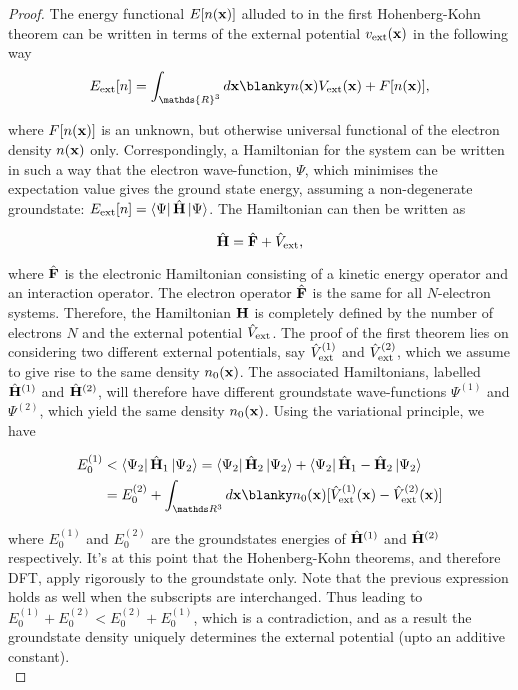 \documentclass{homework}
\begin{document}
\begin{proof}
The energy functional $E[n({\bf x})]$ alluded to in the first Hohenberg-Kohn theorem can be written in terms of the external potential $v_{\textnormal{ext}}({\bf x})$ in the following way 
\begin{equation}
    E_{\textnormal{ext}}[n] = \int_{\mathds{R}^3} d{\bf x}  \blanky n({\bf x}) V_{\textnormal{ext}}({\bf x}) + F[n({\bf x})],
\end{equation}

where $F[n({\bf x})]$ is an unknown, but otherwise universal functional of the electron density $n({\bf x})$ only. Correspondingly, a Hamiltonian for the system can be written in such a way that the electron wave-function, $\Psi$, which minimises the expectation value gives the ground state energy, assuming a non-degenerate groundstate: $E_{\textnormal{ext}}[n] = \bra{\Psi}\hat{\bf H}\ket{\Psi}$. 
The Hamiltonian can then be written as 

$$
\hat{\bf H} = \hat{\bf F} + \hat{V}_{\textnormal{ext}},
$$

where $\hat{\bf F}$ is the electronic Hamiltonian consisting of a kinetic energy operator and an interaction operator. The electron operator $\hat{\bf F}$ is the same for all $N$-electron systems. Therefore, the Hamiltonian ${\bf H}$ is completely defined by the number of electrons $N$ and the external potential $\hat{V}_{\textnormal{ext}}$. The proof of the first theorem lies on considering two different external potentials, say $\hat{V}^{(1)}_{\textnormal{ext}}$ and $\hat{V}^{(2)}_{\textnormal{ext}}$, which we assume to give rise to the same density $n_{0}({\bf x})$. The associated Hamiltonians, labelled $\hat{\bf H}^{(1)}$ and $\hat{\bf H}^{(2)}$, will therefore have different groundstate wave-functions ${\Psi}^{(1)}$ and ${\Psi}^{(2)}$, which yield the same density $n_{0}({\bf x})$. Using the variational principle, we have 

\begin{align}
    E_{0}^{(1)} &< \bra{\Psi_2} \hat{\bf H}_1 \ket{\Psi_2} = \bra{\Psi_2} \hat{\bf H}_2 \ket{\Psi_2} + \bra{\Psi_2} \hat{\bf H}_1-\hat{\bf H}_2 \ket{\Psi_2} \\
    &=  E_{0}^{(2)} + \int_{\R^3} d{\bf x} \blanky n_{0}({\bf x}) [\hat{V}^{(1)}_{\textnormal{ext}}({\bf x})-\hat{V}^{(2)}_{\textnormal{ext}}({\bf x})]
\end{align}

where $E_{0}^{(1)}$ and $E_{0}^{(2)}$ are the groundstates energies of $\hat{\bf H}^{(1)}$ and $\hat{\bf H}^{(2)}$ respectively. It's at this point that the Hohenberg-Kohn theorems, and therefore DFT, apply rigorously to the groundstate only. Note that the previous expression holds as well when the subscripts are interchanged. Thus leading to $ E_{0}^{(1)} +  E_{0}^{(2)} <  E_{0}^{(2)} +  E_{0}^{(1)}$, which is a contradiction, and as a result the groundstate density uniquely determines the external potential (upto an additive constant). \\
\end{proof}
\end{document}
